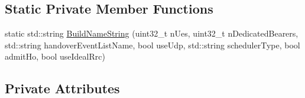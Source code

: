 \subsection*{Static Private Member Functions}
\begin{DoxyCompactItemize}
\item 
static std\+::string \hyperlink{classLteX2HandoverTestCase_ab828d5e2bea55d05dc55db0a85e93ab1}{Build\+Name\+String} (uint32\+\_\+t n\+Ues, uint32\+\_\+t n\+Dedicated\+Bearers, std\+::string handover\+Event\+List\+Name, bool use\+Udp, std\+::string scheduler\+Type, bool admit\+Ho, bool use\+Ideal\+Rrc)
\end{DoxyCompactItemize}
\subsection*{Private Attributes}
